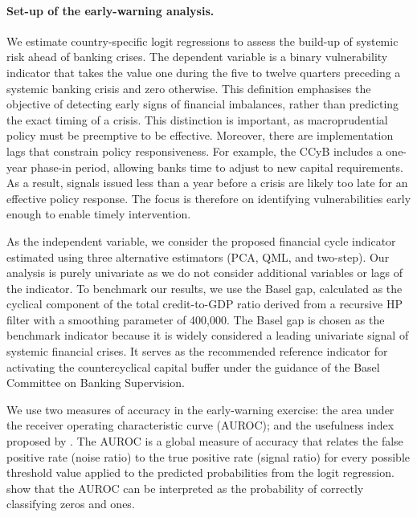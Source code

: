 \paragraph{Set-up of the early-warning analysis.}
We estimate country-specific logit regressions to assess the build-up of systemic risk ahead of banking crises. The dependent variable is a binary vulnerability indicator that takes the value one during the five to twelve quarters preceding a systemic banking crisis and zero otherwise. This definition emphasises the objective of detecting early signs of financial imbalances, rather than predicting the exact timing of a crisis. This distinction is important, as macroprudential policy must be preemptive to be effective. Moreover, there are implementation lags that constrain policy responsiveness. For example, the CCyB includes a one-year phase-in period, allowing banks time to adjust to new capital requirements. As a result, signals issued less than a year before a crisis are likely too late for an effective policy response. The focus is therefore on identifying vulnerabilities early enough to enable timely intervention.

As the independent variable, we consider the proposed financial cycle indicator estimated using three alternative estimators (PCA, QML, and two-step). Our analysis is purely univariate as we do not consider additional variables or lags of the indicator. To benchmark our results, we use the Basel gap, calculated as the cyclical component of the total credit-to-GDP ratio derived from a recursive HP filter with a smoothing parameter of 400,000. The Basel gap is chosen as the benchmark indicator because it is widely considered a leading univariate signal of systemic financial crises. It serves as the recommended reference indicator for activating the countercyclical capital buffer under the guidance of the Basel Committee on Banking Supervision.

We use two measures of accuracy in the early-warning exercise: the area under the receiver operating characteristic curve (AUROC); and the usefulness index proposed by \citet{alessi2011quasi}. The AUROC is a global measure of accuracy that relates the false positive rate (noise ratio) to the true positive rate (signal ratio) for every possible threshold value applied to the predicted probabilities from the logit regression. \citet{hanley1982meaning} show that the AUROC can be interpreted as the probability of correctly classifying zeros and ones.


